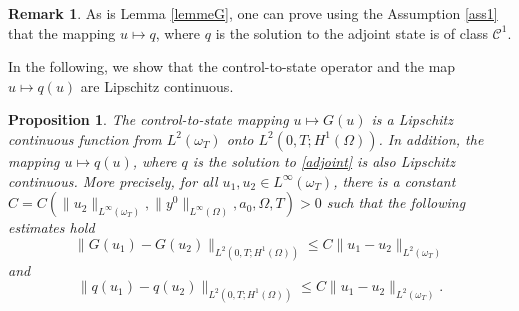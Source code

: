 \documentclass[reqno,twoside]{amsart}
\numberwithin{equation}{section}
\newtheorem{proposition}[theorem]{Proposition}
\theoremstyle{definition}
\newtheorem{remark}[theorem]{Remark}
\numberwithin{equation}{section}
\begin{document}
\begin{remark}
As is Lemma \ref{lemmeG}, one can prove using the Assumption  \ref{ass1} that the mapping $u\mapsto q$, where $q$ is the solution to the adjoint state is of class $\mathcal{C}^1.$
\end{remark}
In the following, we show that the control-to-state operator and the map $u\mapsto q(u)$ are Lipschitz continuous.
\begin{proposition}\label{prop2} The control-to-state mapping  $u\mapsto G(u)$ is a Lipschitz continuous function from $L^2(\omega_T)$ onto $L^2(0,T;H^1(\Omega))$. In addition, the mapping $u\mapsto q(u)$, where $q$ is the solution to \eqref{adjoint} is also Lipschitz continuous. More precisely, for all $u_1,u_2\in L^\infty(\omega_T)$, there is a constant $C=C(\|u_2\|_{L^\infty(\omega_T)},\|y^0\|_{L^\infty(\Omega)},a_0,\Omega,T)>0$ such that the following estimates hold
\begin{equation}\label{estim20}
	\|G(u_1)-G(u_2)\|_{L^2(0,T;H^1(\Omega))}\leq C\|u_1-u_2\|_{L^2(\omega_T)}
\end{equation}	
and
\begin{equation}\label{estim21}
	\|q(u_1)-q(u_2)\|_{L^2(0,T;H^1(\Omega))}\leq C\|u_1-u_2\|_{L^2(\omega_T)}.
\end{equation}
\end{proposition}
\end{document}
